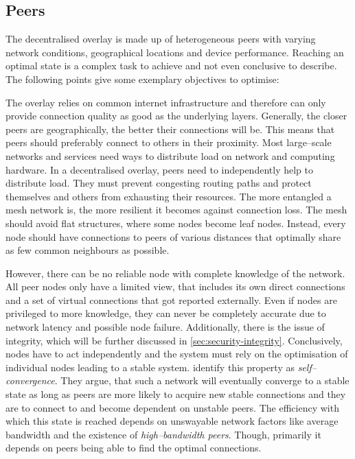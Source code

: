 \subsection{Peers}\label{sec:design-peers}
The decentralised overlay is made up of heterogeneous peers with varying network conditions, geographical locations and device performance. Reaching an optimal state is a complex task to achieve and not even conclusive to describe. The following points give some exemplary objectives to optimise:
\begin{itemize}
    The overlay relies on common internet infrastructure and therefore can only provide connection quality as good as the underlying layers. Generally, the closer peers are geographically, the better their connections will be. This means that peers should preferably connect to others in their proximity.
    Most large–scale networks and services need ways to distribute load on network and computing hardware. In a decentralised overlay, peers need to independently help to distribute load. They must prevent congesting routing paths and protect themselves and others from exhausting their resources.
    The more entangled a mesh network is, the more resilient it becomes against connection loss. The mesh should avoid flat structures, where some nodes become leaf nodes. Instead, every node should have connections to peers of various distances that optimally share as few common neighbours as possible.
\end{itemize}

However, there can be no reliable node with complete knowledge of the network. All peer nodes only have a limited view, that includes its own direct connections and a set of virtual connections that got reported externally. Even if nodes are privileged to more knowledge, they can never be completely accurate due to network latency and possible node failure. Additionally, there is the issue of integrity, which will be further discussed in \vref{sec:security-integrity}. Conclusively, nodes have to act independently and the system must rely on the optimisation of individual nodes leading to a stable system. \citet*[V.B]{coolstreaming-design-theory} identify this property as \textit{self–convergence}. They argue, that such a network will eventually converge to a stable state as long as peers are more likely to acquire new stable connections and they are to connect to and become dependent on unstable peers. The efficiency with which this state is reached depends on unswayable network factors like average bandwidth and the existence of \textit{high–bandwidth peers}. Though, primarily it depends on peers being able to find the optimal connections.

